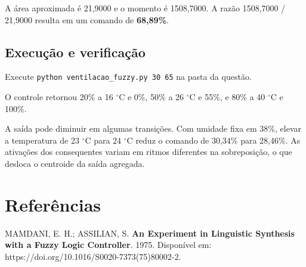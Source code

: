\documentclass[12pt,a4paper]{article}
\begin{document}
A área aproximada é 21,9000 e o momento é 1508,7000. A razão 1508,7000 / 21,9000 resulta em um comando de \textbf{68,89\%}.

\subsection{Execução e verificação}

Execute \texttt{python ventilacao\_fuzzy.py 30 65} na pasta da questão.

O controle retornou 20\% a 16 $^{\circ}$C e 0\%, 50\% a 26 $^{\circ}$C e 55\%, e 80\% a 40 $^{\circ}$C e 100\%.

A saída pode diminuir em algumas transições. Com umidade fixa em 38\%, elevar a temperatura de 23 $^{\circ}$C para 24 $^{\circ}$C reduz o comando de 30,34\% para 28,46\%. As ativações dos consequentes variam em ritmos diferentes na sobreposição, o que desloca o centroide da saída agregada.

\section*{Referências}

\noindent [1] MAMDANI, E. H.; ASSILIAN, S. \textbf{An Experiment in Linguistic Synthesis with a Fuzzy Logic Controller}. 1975. Disponível em: https://doi.org/10.1016/S0020-7373(75)80002-2.
\end{document}
